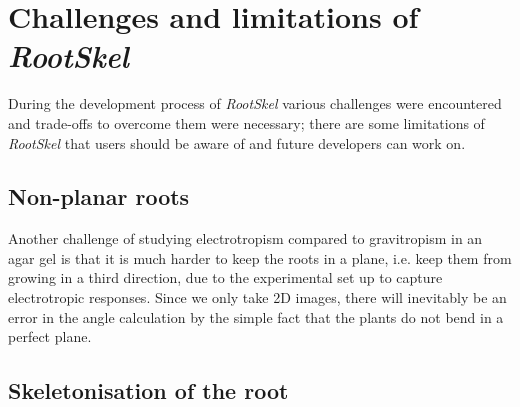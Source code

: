 

\section{Challenges and limitations of \textit{RootSkel}}

During the development process of \textit{RootSkel} various challenges were encountered and trade-offs to overcome them were necessary; there are some limitations of \textit{RootSkel} that users should be aware of and future developers can work on.


\subsection{Non-planar roots}

Another challenge of studying electrotropism compared to gravitropism in an agar gel is that it is much harder to keep the roots in a plane, i.e. keep them from growing in a third direction, due to the experimental set up to capture electrotropic responses. Since we only take 2D images, there will inevitably be an error in the angle calculation by the simple fact that the plants do not bend in a perfect plane.


\subsection{Skeletonisation of the root}

